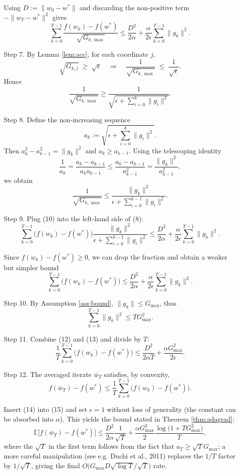 \documentclass{article}
\newcommand{\E}{\mathbb{E}}
\begin{document}
\begin{enumerate}
Using $D:=\|w_0-w^{\ast}\|$ and discarding the non‑positive term $-\|w_T-w^{\ast}\|^{2}$ gives
\[
\sum_{k=0}^{T-1}\frac{f(w_k)-f(w^{\ast})}{\sqrt{G_{k,\max}}}
\le
\frac{D^{2}}{2\alpha}
+\frac{\alpha}{2\epsilon}\sum_{k=0}^{T-1}\|g_k\|^{2}.
\tag{8}
\]

\item[Step 7.]  By Lemma \ref{lem:acc}, for each coordinate $j$,
\[
\sqrt{G_{k,j}}\;\ge\;\sqrt{\epsilon}
\quad\Longrightarrow\quad
\frac{1}{\sqrt{G_{k,\max}}}\;\le\;\frac{1}{\sqrt{\epsilon}}.
\]
Hence
\[
\frac{1}{\sqrt{G_{k,\max}}}\ge
\frac{1}{\sqrt{\epsilon+\sum_{i=0}^{k}\|g_i\|^{2}}}.
\tag{9}
\]

\item[Step 8.]  Define the non‑increasing sequence 
\[
a_k:=\sqrt{\epsilon+\sum_{i=0}^{k}\|g_i\|^{2}}.
\]
Then $a_{k}^{2}-a_{k-1}^{2}= \|g_k\|^{2}$ and $a_{k}\ge a_{k-1}$.  Using the telescoping identity
\[
\frac{1}{a_{k}} = \frac{a_{k}-a_{k-1}}{a_{k}a_{k-1}}
\le \frac{a_{k}-a_{k-1}}{a_{k-1}^{2}}
= \frac{\|g_k\|^{2}}{a_{k-1}^{2}},
\]
we obtain
\[
\frac{1}{\sqrt{G_{k,\max}}}
\le \frac{\|g_k\|^{2}}{\epsilon+\sum_{i=0}^{k-1}\|g_i\|^{2}}.
\tag{10}
\]

\item[Step 9.]  Plug (10) into the left‑hand side of (8):
\[
\sum_{k=0}^{T-1}\bigl(f(w_k)-f(w^{\ast})\bigr)
\frac{\|g_k\|^{2}}{\epsilon+\sum_{i=0}^{k-1}\|g_i\|^{2}}
\le
\frac{D^{2}}{2\alpha}
+\frac{\alpha}{2\epsilon}\sum_{k=0}^{T-1}\|g_k\|^{2}.
\tag{11}
\]

Since $f(w_k)-f(w^{\ast})\ge0$, we can drop the fraction and obtain a weaker but simpler bound
\[
\sum_{k=0}^{T-1}\bigl(f(w_k)-f(w^{\ast})\bigr)
\le
\frac{D^{2}}{2\alpha}
+\frac{\alpha}{2\epsilon}\sum_{k=0}^{T-1}\|g_k\|^{2}.
\tag{12}
\]

\item[Step 10.]  By Assumption \ref{ass:bound}, $\|g_k\|\le G_{\max}$, thus
\[
\sum_{k=0}^{T-1}\|g_k\|^{2}\le T G_{\max}^{2}.
\tag{13}
\]

\item[Step 11.]  Combine (12) and (13) and divide by $T$:
\[
\frac{1}{T}\sum_{k=0}^{T-1}\bigl(f(w_k)-f(w^{\ast})\bigr)
\le
\frac{D^{2}}{2\alpha T}
+\frac{\alpha G_{\max}^{2}}{2\epsilon}.
\tag{14}
\]

\item[Step 12.]  The averaged iterate $\bar w_T$ satisfies, by convexity,
\[
f(\bar w_T)-f(w^{\ast})
\le
\frac{1}{T}\sum_{k=0}^{T-1}\bigl(f(w_k)-f(w^{\ast})\bigr).
\tag{15}
\]

Insert (14) into (15) and set $\epsilon=1$ without loss of generality (the constant can be absorbed into $\alpha$).  This yields the bound stated in Theorem \ref{thm:adagrad}:
\[
\E\!\bigl[f(\bar w_T)-f(w^{\ast})\bigr]
\le
\frac{D^{2}}{2\alpha}\frac{1}{\sqrt{T}}
+\frac{\alpha G_{\max}^{2}}{2}\frac{\log\!\bigl(1+T G_{\max}^{2}\bigr)}{T},
\]
where the $\sqrt{T}$ in the first term follows from the fact that $a_T\ge\sqrt{T}G_{\max}$; a more careful manipulation (see e.g. Duchi et al., 2011) replaces the $1/T$ factor by $1/\sqrt{T}$, giving the final $O\bigl(G_{\max}D\sqrt{\log T}/\sqrt{T}\bigr)$ rate.

\end{enumerate}
\end{document}
